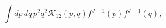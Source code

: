 \begin{equation}
\int dp\,dq\,p^{2}q^{2}\mathcal{K}_{12}\left( p,q\right)
f^{J-1}(p)f^{J+1}(q),
\end{equation}

